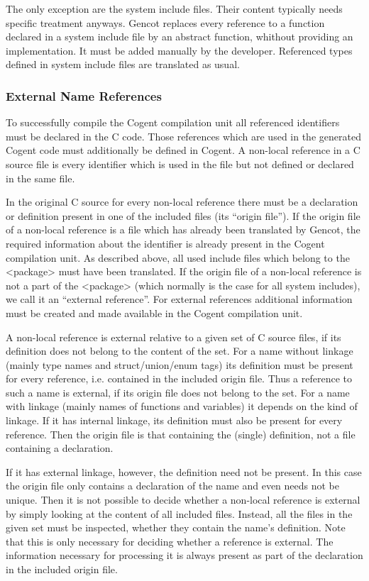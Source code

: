 The only exception are the system include files. Their content typically needs specific treatment anyways. Gencot replaces every 
reference to a function declared in a system include file by an abstract function, whithout providing an implementation. 
It must be added manually by the developer. Referenced types defined in system include files are translated as usual.

\subsubsection{External Name References}
\label{design-modular-extref}

To successfully compile the Cogent compilation unit all referenced identifiers must be declared in the C code. 
Those references which are
used in the generated Cogent code must additionally be defined in Cogent. A non-local reference in a C source file is every
identifier which is used in the file but not defined or declared in the same file.

In the original C source for every non-local reference there must be a declaration or definition present in one of the included
files (its ``origin file''). If the origin file of a non-local reference is a file which has already been translated by 
Gencot, the required information about the identifier is already present in the Cogent compilation unit. As described above, 
all used include files which belong to the <package> must have been translated. If the origin file
of a non-local reference is not a part of the <package> (which normally is the case for all
system includes), we call it an ``external reference''. For external references additional information must be created and 
made available in the Cogent compilation unit.

A non-local reference is external relative to a given set of C source files, if its definition does not belong to the content
of the set. For a name without linkage (mainly type names and struct/union/enum tags) its definition must be present for every
reference, i.e. contained in the included origin file. Thus a reference to such a name is external, if its origin file does 
not belong to the set. For a name with linkage (mainly names of functions and variables) it depends on the kind of linkage.
If it has internal linkage, its definition must also be present for every reference. Then the origin file is that containing the
(single) definition, not a file containing a declaration. 

If it has external linkage, however, the definition need not be present. In this case the origin file only contains a declaration
of the name and even needs not be unique. Then it is not possible to decide whether a non-local reference is external by simply 
looking at the content of all included files. Instead, all the files in the given set must be inspected, whether they contain
the name's definition. Note that this is only necessary for deciding whether a reference is external. The information necessary
for processing it is always present as part of the declaration in the included origin file.


